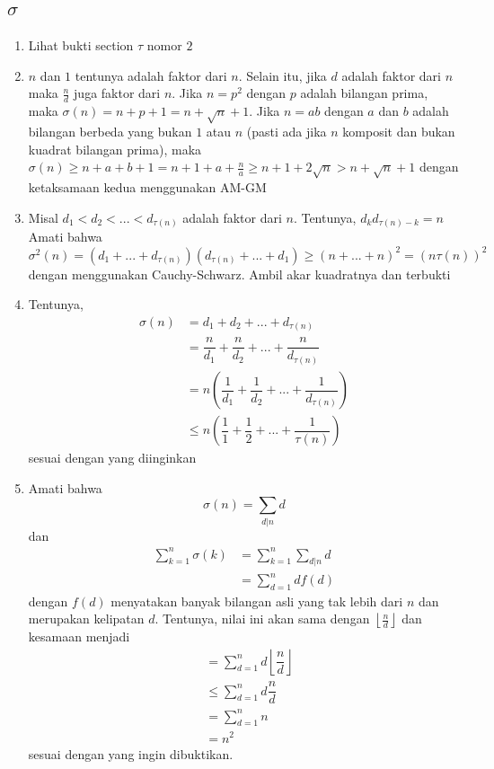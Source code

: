 \documentclass[11pt]{scrartcl}
\begin{document}
\subsection{$\sigma$}
\begin{enumerate}
    \item Lihat bukti section $\tau$ nomor $2$
    \item $n$ dan $1$ tentunya adalah faktor dari $n$. Selain itu, jika $d$ adalah faktor dari $n$ maka $\frac{n}{d}$ juga faktor dari $n$. Jika $n = p^2$ dengan $p$ adalah bilangan prima, maka $\sigma(n) = n + p + 1 = n + \sqrt{n} + 1$. Jika $n = ab$ dengan $a$ dan $b$ adalah bilangan berbeda yang bukan $1$ atau $n$ (pasti ada jika $n$ komposit dan bukan kuadrat bilangan prima), maka $\sigma(n) \geq n + a + b + 1 = n + 1 + a + \frac{n}{a} \geq n + 1 + 2\sqrt{n} > n + \sqrt{n} + 1$ dengan ketaksamaan kedua menggunakan AM-GM
    \item Misal $d_1 < d_2 < ... < d_{\tau(n)}$ adalah faktor dari $n$. Tentunya, $d_kd_{\tau(n) - k} = n$ Amati bahwa $\sigma^2(n) = (d_1 +  ... + d_{\tau(n)})(d_{\tau(n)} + ... + d_1) \geq (n + ... + n)^2 = (n\tau(n))^2$ dengan menggunakan Cauchy-Schwarz. Ambil akar kuadratnya dan terbukti
    \item Tentunya, 
    \begin{align*}
        \sigma(n) &= d_1 + d_2 + ... + d_{\tau(n)} \\
        &= \dfrac{n}{d_1} + \dfrac{n}{d_2} + ... + \dfrac{n}{d_{\tau(n)}}\\
        &= n \left(\dfrac{1}{d_1} + \dfrac{1}{d_2} + ... + \dfrac{1}{d_{\tau(n)}}\right)\\
        &\leq n \left(\dfrac{1}{1} + \dfrac{1}{2} + ... + \dfrac{1}{\tau(n)}\right)
    \end{align*}
    sesuai dengan yang diinginkan
    \item Amati bahwa \[\sigma(n) = \sum_{d|n} d\] dan 
    \begin{align*}
        \sum_{k = 1}^n \sigma(k) &= \sum_{k = 1}^n \sum_{d|n} d \\
        &= \sum_{d = 1}^{n} df(d) 
    \end{align*}
    dengan $f(d)$ menyatakan banyak bilangan asli yang tak lebih dari $n$ dan merupakan kelipatan $d$. Tentunya, nilai ini akan sama dengan $\left\lfloor \frac{n}{d} \right\rfloor$ dan kesamaan menjadi 
    \begin{align*}
        &= \sum_{d = 1}^{n} d\left\lfloor \dfrac{n}{d} \right\rfloor \\
        &\leq \sum_{d = 1}^{n} d \dfrac{n}{d} \\
        &= \sum_{d = 1}^{n} n \\
        &= n^2
    \end{align*}
    sesuai dengan yang ingin dibuktikan.
\end{enumerate}
\end{document}
